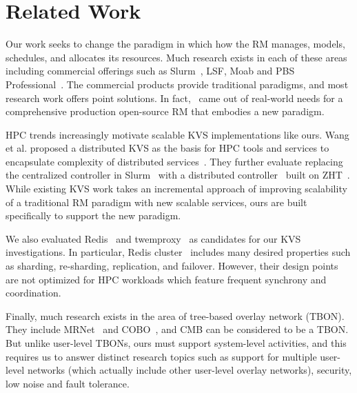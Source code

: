 \section{Related Work}
Our work seeks to change the paradigm in which 
how the RM manages, models, schedules, and
allocates its resources. Much research exists in
each of these areas including commercial offerings
such as Slurm~\cite{Jette02slurm}, LSF,
Moab and PBS Professional~\cite{PSBPro}.
The commercial products provide traditional paradigms, and
most research work offers 
point solutions. In fact, \flux\ came out of real-world needs 
for a comprehensive production open-source RM that embodies a new paradigm. 

HPC trends increasingly motivate scalable KVS implementations 
like ours. Wang et al. proposed a distributed KVS 
as the basis for HPC tools and services to encapsulate
complexity of distributed services~\cite{Wang:2013:USE:2503210.2503239}.
%
They further evaluate replacing the centralized controller in
Slurm~\cite{Jette02slurm} with a distributed controller~\cite{Slurmpp}
built on ZHT~\cite{Li:2013:ZLR:2510661.2511401}.
While existing KVS work takes an incremental approach of improving 
scalability of a traditional RM paradigm with new scalable services,
ours are built specifically to support the new paradigm. 

We also evaluated Redis~\cite{Redis} and twemproxy~\cite{Twemproxy}
as candidates for our KVS investigations.
In particular, Redis cluster~\cite{RedisClusterTut,RedisClusterSpec} 
includes many desired properties such as 
sharding, re-sharding, replication, and failover.
However, their design points are not optimized
for HPC workloads which feature frequent synchrony and coordination. 


%
Finally, much research exists in the area of tree-based overlay network (TBON). 
They include MRNet~\cite{mrnet} and COBO~\cite{launchmon}, and 
CMB can be considered to be a TBON. But unlike user-level
TBONs, ours must support system-level activities, and this 
requires us to answer distinct research topics
such as support for multiple user-level networks (which actually
include other user-level overlay networks), security, low noise 
and fault tolerance. 

